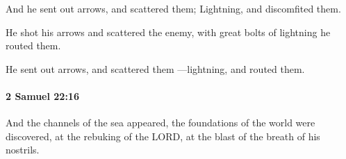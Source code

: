 			\begin{versebox}
					\item[BHS] 
					\item[ASV] And he sent out arrows, and scattered them; Lightning, and discomfited them.
					\item[NIV] He shot his arrows and scattered the enemy, with great bolts of lightning he routed them.
					\item[NRSV] He sent out arrows, and scattered them —lightning, and routed them.
			\end{versebox}

		\paragraph{2 Samuel 22:16} %
			\label{2SAMUEL-22-16}

			And the channels of the sea appeared, the foundations of the world were discovered, at the rebuking of the LORD, at the blast of the breath of his nostrils.

